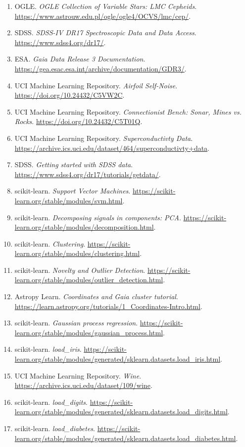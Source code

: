 \begin{enumerate}[leftmargin=2em]
\item OGLE. \emph{OGLE Collection of Variable Stars: LMC Cepheids}. \url{https://www.astrouw.edu.pl/ogle/ogle4/OCVS/lmc/cep/}.
\item SDSS. \emph{SDSS-IV DR17 Spectroscopic Data and Data Access}. \url{https://www.sdss4.org/dr17/}.
\item ESA. \emph{Gaia Data Release 3 Documentation}. \url{https://gea.esac.esa.int/archive/documentation/GDR3/}.
\item UCI Machine Learning Repository. \emph{Airfoil Self-Noise}. \url{https://doi.org/10.24432/C5VW2C}.
\item UCI Machine Learning Repository. \emph{Connectionist Bench: Sonar, Mines vs. Rocks}. \url{https://doi.org/10.24432/C5T01Q}.
\item UCI Machine Learning Repository. \emph{Superconductivty Data}. \url{https://archive.ics.uci.edu/dataset/464/superconductivty+data}.
\item SDSS. \emph{Getting started with SDSS data}. \url{https://www.sdss4.org/dr17/tutorials/getdata/}.
\item scikit-learn. \emph{Support Vector Machines}. \url{https://scikit-learn.org/stable/modules/svm.html}.
\item scikit-learn. \emph{Decomposing signals in components: PCA}. \url{https://scikit-learn.org/stable/modules/decomposition.html}.
\item scikit-learn. \emph{Clustering}. \url{https://scikit-learn.org/stable/modules/clustering.html}.
\item scikit-learn. \emph{Novelty and Outlier Detection}. \url{https://scikit-learn.org/stable/modules/outlier_detection.html}.
\item Astropy Learn. \emph{Coordinates and Gaia cluster tutorial}. \url{https://learn.astropy.org/tutorials/1_Coordinates-Intro.html}.
\item scikit-learn. \emph{Gaussian process regression}. \url{https://scikit-learn.org/stable/modules/gaussian_process.html}.
\item scikit-learn. \emph{load\_iris}. \url{https://scikit-learn.org/stable/modules/generated/sklearn.datasets.load_iris.html}.
\item UCI Machine Learning Repository. \emph{Wine}. \url{https://archive.ics.uci.edu/dataset/109/wine}.
\item scikit-learn. \emph{load\_digits}. \url{https://scikit-learn.org/stable/modules/generated/sklearn.datasets.load_digits.html}.
\item scikit-learn. \emph{load\_diabetes}. \url{https://scikit-learn.org/stable/modules/generated/sklearn.datasets.load_diabetes.html}.

\end{enumerate}
